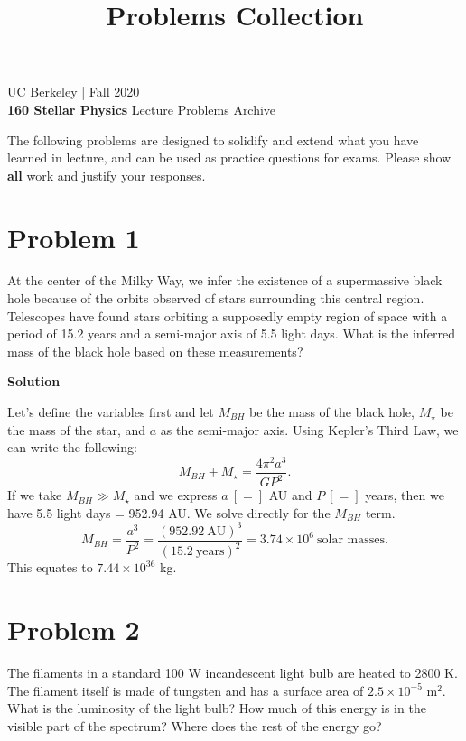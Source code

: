 \documentclass[12pt]{article}
\title{Problems Collection}
\begin{document}
UC Berkeley | Fall 2020 \\
\textbf{160 Stellar Physics} Lecture \hfill Problems Archive
\vspace{-0.5cm}

\hrulefill

The following problems are designed to solidify and extend what you have learned in lecture, and can be used as practice questions for exams. Please show \textbf{all} work and justify your responses.

\section*{Problem 1}
At the center of the Milky Way, we infer the existence of a supermassive black hole because of the orbits observed of stars surrounding this central region. Telescopes have found stars orbiting a supposedly empty region of space with a period of 15.2 years and a semi-major axis of 5.5 light days. What is the inferred mass of the black hole based on these measurements?

\vspace{0.5cm}
\begin{adjustwidth}{2.5em}{0pt}
\begin{siderules}
 {\color{blue} \textbf{Solution}
 
 Let's define the variables first and let $M_{BH}$ be the mass of the black hole, $M_{\star}$ be the mass of the star, and $a$ as the semi-major axis. Using Kepler's Third Law, we can write the following:
 \begin{equation}
 M_{BH} + M_{\star} = \frac{4\pi^2 a^3}{GP^2}.
 \end{equation}
 If we take $M_{BH} \gg M_{\star}$ and we express $a \ [=]$ AU and $P \ [=]$ years, then we have 5.5 light days = 952.94 AU. We solve directly for the $M_{BH}$ term.
 \begin{equation}
 M_{BH} = \frac{a^3}{P^2} = \frac{(952.92 \ \text{AU})^3}{(15.2 \ \text{years})^2} = 3.74 \times 10^6 \ \text{solar masses}.
 \end{equation}
 This equates to $7.44 \times 10^{36}$ kg.
 }
\end{siderules}
\end{adjustwidth}

\section*{Problem 2}
The filaments in a standard 100 W incandescent light bulb are heated to 2800 K. The filament itself is made of tungsten and has a surface area of $2.5 \times 10^{-5}$ m$^2$. What is the luminosity of the light bulb? How much of this energy is in the visible part of the spectrum? Where does the rest of the energy go?
\end{document}
